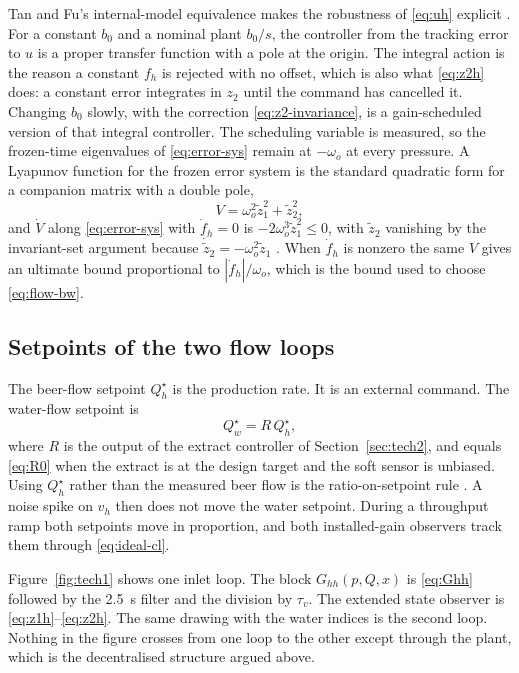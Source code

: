 Tan and Fu's internal-model equivalence makes the robustness of \eqref{eq:uh} explicit \cite{tan2016imc}. For a constant $b_0$ and a nominal plant $b_0/s$, the controller from the tracking error to $u$ is a proper transfer function with a pole at the origin. The integral action is the reason a constant $f_h$ is rejected with no offset, which is also what \eqref{eq:z2h} does: a constant error integrates in $z_2$ until the command has cancelled it. Changing $b_0$ slowly, with the correction \eqref{eq:z2-invariance}, is a gain-scheduled version of that integral controller. The scheduling variable is measured, so the frozen-time eigenvalues of \eqref{eq:error-sys} remain at $-\omega_o$ at every pressure. A Lyapunov function for the frozen error system is the standard quadratic form for a companion matrix with a double pole,
\begin{equation}
\label{eq:lyap}
V = \omega_o^2 \tilde{z}_1^2 + \tilde{z}_2^2,
\end{equation}
and $\dot{V}$ along \eqref{eq:error-sys} with $\dot{f}_h=0$ is $-2\omega_o^3 \tilde{z}_1^2 \le 0$, with $\tilde{z}_2$ vanishing by the invariant-set argument because $\dot{\tilde{z}}_2 = -\omega_o^2\tilde{z}_1$ \cite{slotine1991applied,khalil2002nonlinear}. When $\dot{f}_h$ is nonzero the same $V$ gives an ultimate bound proportional to $|\dot{f}_h|/\omega_o$, which is the bound used to choose \eqref{eq:flow-bw}.

\subsection{Setpoints of the two flow loops}

The beer-flow setpoint $Q_h^\star$ is the production rate. It is an external command. The water-flow setpoint is
\begin{equation}
\label{eq:qw-star}
Q_w^\star = R\, Q_h^\star,
\end{equation}
where $R$ is the output of the extract controller of Section~\ref{sec:tech2}, and equals \eqref{eq:R0} when the extract is at the design target and the soft sensor is unbiased. Using $Q_h^\star$ rather than the measured beer flow is the ratio-on-setpoint rule \cite{shinskey1996process}. A noise spike on $v_h$ then does not move the water setpoint. During a throughput ramp both setpoints move in proportion, and both installed-gain observers track them through \eqref{eq:ideal-cl}.

Figure~\ref{fig:tech1} shows one inlet loop. The block $G_{hh}(p,Q,x)$ is \eqref{eq:Ghh} followed by the \SI{2.5}{s} filter and the division by $\tau_v$. The extended state observer is \eqref{eq:z1h}--\eqref{eq:z2h}. The same drawing with the water indices is the second loop. Nothing in the figure crosses from one loop to the other except through the plant, which is the decentralised structure argued above.

